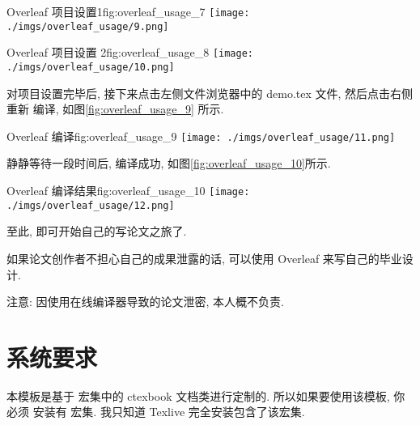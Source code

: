 \documentclass[doctor]{cugthesis}
\begin{document}
\begin{tfig}{Overleaf   项目设置1}{fig:overleaf_usage_7}
    \texttt{[image: ./imgs/overleaf\_usage/9.png]}
\end{tfig}

\begin{tfig}{Overleaf  项目设置 2}{fig:overleaf_usage_8}
    \texttt{[image: ./imgs/overleaf\_usage/10.png]}
\end{tfig}

对项目设置完毕后, 接下来点击左侧文件浏览器中的 demo.tex 文件, 然后点击右侧重新
编译, 如图\ref{fig:overleaf_usage_9} 所示.

\begin{tfig}{Overleaf   编译}{fig:overleaf_usage_9}
    \texttt{[image: ./imgs/overleaf\_usage/11.png]}
\end{tfig}

静静等待一段时间后, 编译成功, 如图\ref{fig:overleaf_usage_10}所示.

\begin{tfig}{Overleaf   编译结果}{fig:overleaf_usage_10}
    \texttt{[image: ./imgs/overleaf\_usage/12.png]}
\end{tfig}

至此, 即可开始自己的写论文之旅了.

如果论文创作者不担心自己的成果泄露的话, 可以使用 Overleaf 来写自己的毕业设计.

注意: 因使用在线编译器导致的论文泄密, 本人概不负责.

\section{系统要求}
\label{sec:xi_tong_yao_qiu_}
本模板是基于 \CTeX{} 宏集中的 ctexbook 文档类进行定制的. 所以如果要使用该模板, 你必须
安装有 \CTeX{} 宏集. 我只知道 Texlive 完全安装包含了该宏集.
\end{document}

